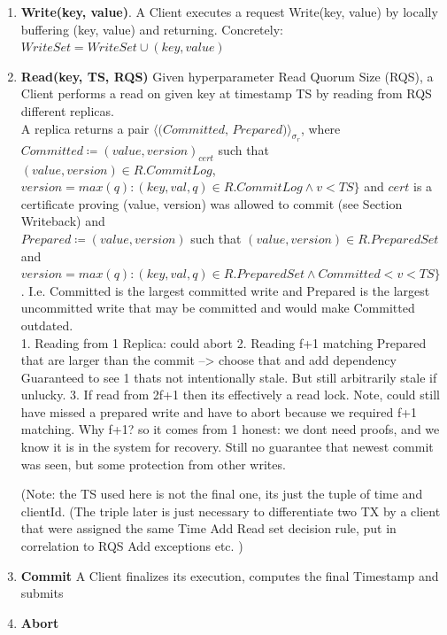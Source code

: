 \begin{enumerate}
\item \textbf{Write(key, value)}. A Client executes a request Write(key, value) by locally buffering (key, value) and returning. Concretely: $WriteSet = WriteSet \cup (key, value)$
\item \textbf{Read(key, TS, RQS)} Given hyperparameter Read Quorum Size (RQS), a Client performs a read on given key at timestamp TS by reading from RQS different replicas. \\

A replica returns a pair $\langle \textit{(Committed, Prepared)} \rangle _{\sigma_r}$, where \\
$Committed \coloneqq (value, version)_{cert}$ such that $ (value, version) \in R.CommitLog$, $version = max(q) : (key, val, q) \in R.CommitLog \land v < TS \}$ and $cert$ is a certificate proving (value, version) was allowed to commit (see Section Writeback) and\\
 $Prepared \coloneqq (value, version)$ such that $(value, version) \in R.PreparedSet$ and $version = max(q) : (key, val, q) \in R.PreparedSet \land Committed < v < TS \}$ .
I.e. Committed is the largest committed write and Prepared is the largest uncommitted write that may be  committed and would make Committed outdated. \\

1. Reading from 1 Replica: could abort
2. Reading f+1 matching Prepared that are larger than the commit --> choose that and add dependency
Guaranteed to see 1 thats not intentionally stale. But still arbitrarily stale if unlucky.
3. If read from 2f+1 then its effectively a read lock. Note, could still have missed a prepared write and have to abort because we required f+1 matching. Why f+1? so it comes from 1 honest: we dont need proofs, and we know it is in the system for recovery.
Still no guarantee that newest commit was seen, but some protection from other writes.


(Note: the TS used here is not the final one, its just the tuple of time and clientId. (The triple later is just necessary to differentiate two TX by a client that were assigned the same Time
Add Read set decision rule, put in correlation to RQS
Add exceptions etc.
)


\item \textbf{Commit} A Client finalizes its execution, computes the final Timestamp and submits 

\item \textbf{Abort}

\end{enumerate}
 


